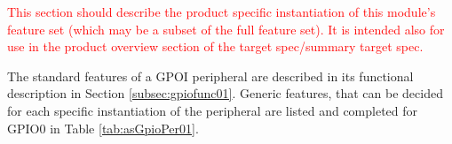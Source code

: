 \textcolor{red}{This section should describe the product specific instantiation of this module’s feature set (which may be a subset of the full feature set). It is intended also for use in the product overview section of the target spec/summary target spec.}

The standard features of a GPOI peripheral are described in its functional description in Section \ref{subsec:gpiofunc01}. Generic features, that can be decided for each specific instantiation of the peripheral are listed and completed for GPIO0 in Table \ref{tab:asGpioPer01}.
